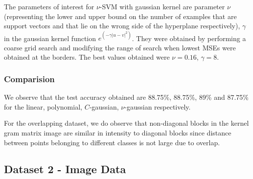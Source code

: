 \documentclass{article}
\begin{document}
The parameters of interest for $\nu$-SVM with gaussian kernel are parameter $\nu$(representing the lower and upper bound on the number of examples that are support vectors and that lie on the wrong side of the hyperplane respectively), $\gamma$ in the gaussian kernel function $e^{(-\gamma|u-v|^{2})}$. They were obtained by performing a coarse grid search and modifying the range of search when lowest MSEs were obtained at the borders.
The best values obtained were $\nu=0.16$, $\gamma=8$.

\subsubsection{Comparision}
We observe that the test accuracy obtained are 88.75\%, 88.75\%, 89\% and 87.75\% for the linear, polynomial, $C$-gaussian, $\nu$-gaussian respectively. 

For the overlapping dataset, we do observe that non-diagonal blocks in the kernel gram matrix image are similar in intensity to diagonal blocks since distance between points belonging to different classes is not large due to overlap.

\subsection{Dataset 2 - Image Data}
\end{document}
